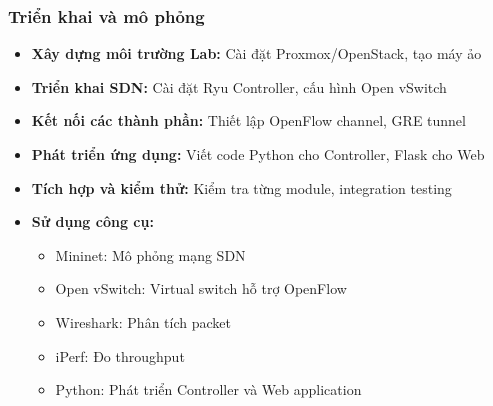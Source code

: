 \subsubsection{Triển khai và mô phỏng}
\begin{itemize}
    \item \textbf{Xây dựng môi trường Lab:} Cài đặt Proxmox/OpenStack, tạo máy ảo
    \item \textbf{Triển khai SDN:} Cài đặt Ryu Controller, cấu hình Open vSwitch
    \item \textbf{Kết nối các thành phần:} Thiết lập OpenFlow channel, GRE tunnel
    \item \textbf{Phát triển ứng dụng:} Viết code Python cho Controller, Flask cho Web
    \item \textbf{Tích hợp và kiểm thử:} Kiểm tra từng module, integration testing
    \item \textbf{Sử dụng công cụ:}
    \begin{itemize}
        \item Mininet: Mô phỏng mạng SDN
        \item Open vSwitch: Virtual switch hỗ trợ OpenFlow
        \item Wireshark: Phân tích packet
        \item iPerf: Đo throughput
        \item Python: Phát triển Controller và Web application
    \end{itemize}
\end{itemize}

